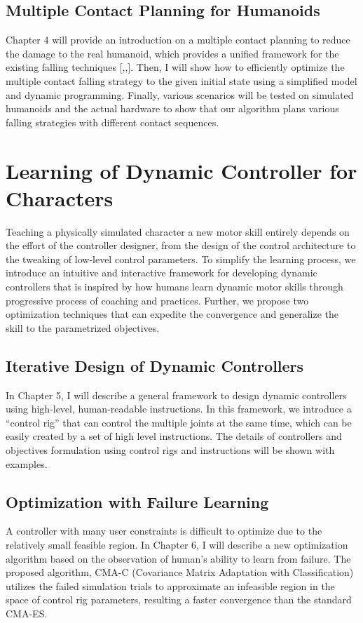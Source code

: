 \subsection{Multiple Contact Planning for Humanoids}
Chapter 4 will provide an introduction on a multiple contact planning to
reduce the damage to the real humanoid, which provides a unified framework
for the existing falling techniques [,,].
Then, I will show how to efficiently optimize the multiple contact falling
strategy to the given initial state using a simplified model and dynamic 
programming.
Finally, various scenarios will be tested on simulated humanoids and the
actual hardware to show that our algorithm plans various falling strategies
with different contact sequences.

\section{Learning of Dynamic Controller for Characters}
Teaching a physically simulated character a new motor skill entirely depends 
on the effort of the controller designer, from the design of the control 
architecture to the tweaking of low-level control parameters.
To simplify the learning process, we introduce an intuitive and 
interactive framework for developing dynamic controllers that is inspired by
how humans learn dynamic motor skills through progressive process of coaching
and practices.
Further, we propose two optimization techniques that can expedite the convergence and generalize the skill to the parametrized objectives.

\subsection{Iterative Design of Dynamic Controllers}
In Chapter 5, I will describe a general framework to design dynamic
controllers using high-level, human-readable instructions.
In this framework, we introduce a “control rig” that can control the multiple
joints at the same time, which can be easily created by a set of high level
instructions.
The details of controllers and objectives formulation using control rigs and
instructions will be shown with examples.

\subsection{Optimization with Failure Learning}
A controller with many user constraints is difficult to optimize due to the
relatively small feasible region.
In Chapter 6, I will describe a new optimization algorithm based on the
observation of human’s ability to learn from failure.
The proposed algorithm, CMA-C (Covariance Matrix Adaptation with
Classification) utilizes the failed simulation trials to approximate 
an infeasible region in the space of control rig parameters, resulting a
faster convergence than the standard CMA-ES.

